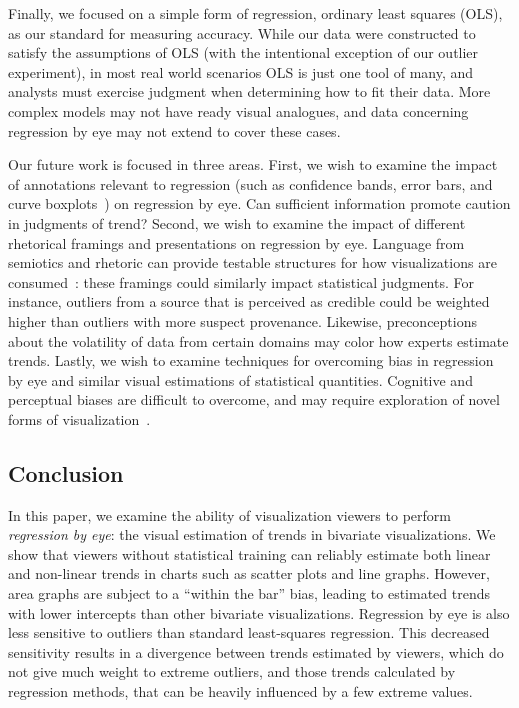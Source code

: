 \documentclass{sigchi}
\begin{document}
Finally, we focused on a simple form of regression, ordinary least squares (OLS), as our standard for measuring accuracy. While our data were constructed to satisfy the assumptions of OLS (with the intentional exception of our outlier experiment), in most real world scenarios OLS is just one tool of many, and analysts must exercise judgment when determining how to fit their data. More complex models may not have ready visual analogues, and data concerning regression by eye may not extend to cover these cases.

Our future work is focused in three areas. First, we wish to examine the impact of annotations relevant to regression (such as confidence bands, error bars, and curve boxplots~\cite{mirzargar2014curve}) on regression by eye. Can sufficient information promote caution in judgments of trend? Second, we wish to examine the impact of different rhetorical framings and presentations on regression by eye. Language from semiotics and rhetoric can provide testable structures for how visualizations are consumed~\cite{hullman2011visualization}: these framings could similarly impact statistical judgments. For instance, outliers from a source that is perceived as credible could be weighted higher than outliers with more suspect provenance. Likewise, preconceptions about the volatility of data from certain domains may color how experts estimate trends. Lastly, we wish to examine techniques for overcoming bias in regression by eye and similar visual estimations of statistical quantities. Cognitive and perceptual biases are difficult to overcome, and may require exploration of novel forms of visualization~\cite{micallef2012assessing}.

\subsection{Conclusion}

In this paper, we examine the ability of visualization viewers to perform \emph{regression by eye}: the visual estimation of trends in bivariate visualizations. We show that viewers without statistical training can reliably estimate both linear and non-linear trends in charts such as scatter plots and line graphs. However, area graphs are subject to a ``within the bar'' bias, leading to estimated trends with lower intercepts than other bivariate visualizations. Regression by eye is also less sensitive to outliers than standard least-squares regression. This decreased sensitivity results in a divergence between trends estimated by viewers, which do not give much weight to extreme outliers, and those trends calculated by regression methods, that can be heavily influenced by a few extreme values. 
\end{document}
